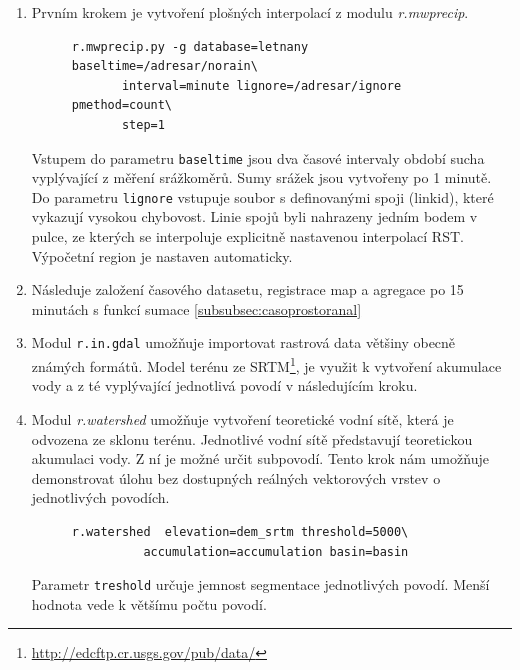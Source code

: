 \documentclass[a4paper,12pt,oneside]{report}
\begin{document}
\begin{enumerate}

\item Prvním krokem je vytvoření plošných interpolací z modulu \textit{r.mwprecip}. 

\begin{figure}[h!]
\begin{footnotesize}
\lstset{extendedchars=false,
escapeinside=''}
\begin{lstlisting}[style=mybash]
r.mwprecip.py -g database=letnany baseltime=/adresar/norain\
       interval=minute lignore=/adresar/ignore pmethod=count\ 
       step=1 
\end{lstlisting}
\end{footnotesize} 
\end{figure}
Vstupem do parametru \texttt{baseltime} jsou dva  časové intervaly období sucha vyplývající z měření srážkoměrů. Sumy srážek jsou vytvořeny po 1 minutě. Do parametru \texttt{lignore} vstupuje soubor s definovanými spoji (linkid), které vykazují vysokou chybovost. Linie spojů byli nahrazeny jedním bodem v pulce, ze kterých se interpoluje explicitně nastavenou interpolací RST. Výpočetní region je nastaven automaticky.


\item Následuje založení časového datasetu, registrace map a agregace po 15 minutách s funkcí sumace \ref{subsubsec:casoprostoranal}

\item Modul \texttt{r.in.gdal} umožňuje importovat rastrová data většiny obecně známých formátů.  Model terénu ze \ac{SRTM}\footnote{\url{http://edcftp.cr.usgs.gov/pub/data/}}, je využit k vytvoření akumulace vody a z té vyplývající jednotlivá povodí v následujícím kroku.

\item Modul \textit{r.watershed } umožňuje vytvoření teoretické vodní sítě, která je odvozena ze sklonu terénu. Jednotlivé vodní sítě představují teoretickou akumulaci vody. Z ní je možné určit subpovodí. Tento krok nám umožňuje demonstrovat úlohu bez dostupných reálných vektorových vrstev o jednotlivých povodích.
\begin{figure}[h!]
\begin{footnotesize}
\lstset{extendedchars=false,
escapeinside=''}
\begin{lstlisting}[style=mybash]
r.watershed  elevation=dem_srtm threshold=5000\
          accumulation=accumulation basin=basin
\end{lstlisting}
\end{footnotesize} 
\end{figure}
Parametr \texttt{treshold} určuje jemnost segmentace jednotlivých povodí. Menší hodnota vede k většímu počtu povodí.


\end{enumerate}
\end{document}

